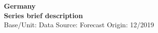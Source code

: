 \documentclass[a4paper,10pt]{article}
\begin{document}
\thispagestyle{empty}
\begin{landscape}
\begin{center}

\textbf{Germany} \\ 

\textbf{Series brief description} \\ 

Base/Unit: 
\space \space \space Data Source:  
\space \space \space Forecast Origin: 12/2019 \\ 
\end{center}

\begin{footnotesize} \singlespacing  \end{footnotesize} 

\end{landscape}
\end{document}
